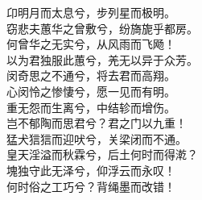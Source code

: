 \documentclass[]{article}
\begin{document}
卬明月而太息兮，步列星而极明。\\
窃悲夫蕙华之曾敷兮，纷旖旎乎都房。\\
何曾华之无实兮，从风雨而飞飏！\\
以为君独服此蕙兮，羌无以异于众芳。\\
闵奇思之不通兮，将去君而高翔。\\
心闵怜之惨悽兮，愿一见而有明。\\
重无怨而生离兮，中结轸而增伤。\\
岂不郁陶而思君兮？君之门以九重！\\
猛犬狺狺而迎吠兮，关梁闭而不通。\\
皇天淫溢而秋霖兮，后土何时而得漧？\\
塊独守此无泽兮，仰浮云而永叹！\\
何时俗之工巧兮？背绳墨而改错！
\end{document}
